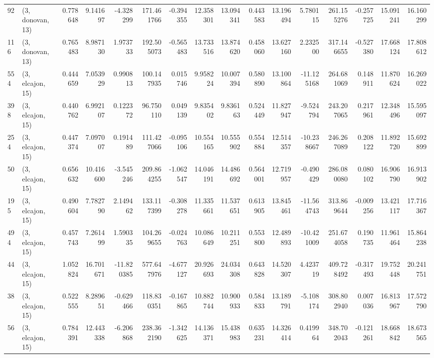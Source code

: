 \begin{tabular}{llrrrrrrrrrrrrrr}
92  &  (3, donovan, 13) &   0.778648 &   9.141697 &  -4.328299 &   171.461766 &  -0.394355 &  12.358301 &  13.094341 &  0.443583 &  13.196494 &   5.780115 &   261.155276 & -0.257725 &  15.091241 &  16.160299 \\
116 &  (3, donovan, 13) &   0.765483 &   8.987130 &   1.973733 &   192.505073 &  -0.565483 &  13.733516 &  13.874620 &  0.458060 &  13.627160 &   2.232500 &   317.146655 & -0.527380 &  17.668124 &  17.808612 \\
554 &  (3, elcajon, 15) &   0.444659 &   7.053929 &   0.990813 &   100.147935 &   0.015746 &   9.958224 &  10.007394 &  0.580890 &  13.100864 & -11.125168 &   264.681069 &  0.148911 &  11.870624 &  16.269022 \\
398 &  (3, elcajon, 15) &   0.440762 &   6.992107 &   0.122372 &    96.750110 &   0.049139 &   9.835402 &   9.836163 &  0.524449 &  11.827947 &  -9.524794 &   243.207065 &  0.217961 &  12.348496 &  15.595097 \\
254 &  (3, elcajon, 15) &   0.447374 &   7.097007 &   0.191489 &   111.427066 &  -0.095106 &  10.554165 &  10.555902 &  0.554884 &  12.514357 & -10.238667 &   246.267089 &  0.208122 &  11.892720 &  15.692899 \\
50  &  (3, elcajon, 15) &   0.656632 &  10.416600 &  -3.545246 &   209.864255 &  -1.062547 &  14.046191 &  14.486692 &  0.564001 &  12.719957 &  -0.490429 &   286.080080 &  0.080102 &  16.906790 &  16.913902 \\
195 &  (3, elcajon, 15) &   0.490604 &   7.782790 &   2.149462 &   133.117399 &  -0.308278 &  11.335661 &  11.537651 &  0.613905 &  13.845461 & -11.564743 &   313.869644 & -0.009256 &  13.421117 &  17.716367 \\
494 &  (3, elcajon, 15) &   0.457743 &   7.261499 &   1.590335 &   104.269655 &  -0.024763 &  10.086649 &  10.211251 &  0.553800 &  12.489893 & -10.421009 &   251.674058 &  0.190735 &  11.961464 &  15.864238 \\
44  &  (3, elcajon, 15) &   1.052824 &  16.701671 & -11.820385 &   577.647976 &  -4.677127 &  20.926693 &  24.034308 &  0.643828 &  14.520307 &   4.423719 &   409.728492 & -0.317493 &  19.752448 &  20.241751 \\
38  &  (3, elcajon, 15) &   0.522555 &   8.289651 &  -0.629466 &   118.830351 &  -0.167865 &  10.882744 &  10.900933 &  0.584833 &  13.189791 &  -5.108174 &   308.802940 &  0.007036 &  16.813967 &  17.572790 \\
56  &  (3, elcajon, 15) &   0.784391 &  12.443338 &  -6.206868 &   238.362190 &  -1.342625 &  14.136371 &  15.438983 &  0.635231 &  14.326414 &   0.419964 &   348.702043 & -0.121261 &  18.668842 &  18.673565 \\

\end{tabular}
